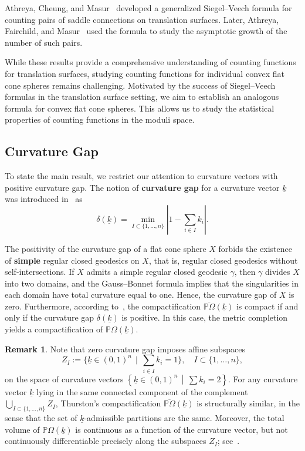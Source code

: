 \documentclass{compositio}
\numberwithin{equation}{section}
\numberwithin{figure}{section}
\theoremstyle{definition}
\newtheorem{remark}[definition]{Remark}
\theoremstyle{plain}
\begin{document}
{Athreya, Cheung, and Masur~\cite{athreya2019siegel} developed a generalized Siegel--Veech formula for counting pairs of saddle connections on translation surfaces. Later, Athreya, Fairchild, and Masur~\cite{Athreya2023} used the formula to study the asymptotic growth of the number of such pairs.\newline

While these results provide a comprehensive understanding of counting functions for translation surfaces, studying counting functions for individual convex flat cone spheres remains challenging. Motivated by the success of Siegel--Veech formulas in the translation surface setting, we aim to establish an analogous formula for convex flat cone spheres. This allows us to study the statistical properties of counting functions in the moduli space.


\subsection{Curvature Gap}
To state the main result, we restrict our attention to curvature vectors with positive curvature gap. The notion of \textbf{curvature gap} for a curvature vector $\underline{k}$ was introduced in~\cite{fu2023boundssaddleconnectionsflat} as
\begin{equation}\label{equ:curvaturegap}
    \delta(\underline{k}) = \min_{I \subset \{1, \ldots, n\}} \left| 1 - \sum_{i \in I} k_i \right|.
\end{equation}

The positivity of the curvature gap of a flat cone sphere $X$ forbids the existence of \textbf{simple} regular closed geodesics on $X$, that is, regular closed geodesics without self-intersections. If $X$ admits a simple regular closed geodesic $\gamma$, then $\gamma$ divides $X$ into two domains, and the Gauss--Bonnet formula implies that the singularities in each domain have total curvature equal to one. Hence, the curvature gap of $X$ is zero. Furthermore, according to~\cite{thu}, the compactification $\overline{\mathbb{P}\Omega}(\underline{k})$ is compact if and only if the curvature gap $\delta(\underline{k})$ is positive. In this case, the metric completion yields a compactification of $\mathbb{P}\Omega(\underline{k})$.

\begin{remark}
    Note that zero curvature gap imposes affine subspaces 
$$
Z_I := \Big\{ \underline{k} \in (0,1)^n \,\mid\, \sum_{i \in I} k_i = 1 \Big\}, \quad I \subset \{1,\ldots,n\},
$$
on the space of curvature vectors $\left\{ \underline{k} \in (0,1)^n \,\middle|\, \sum k_i = 2 \right\}$. For any curvature vector $\underline{k}$ lying in the same connected component of the complement $\bigcup_{I \subset \{1,\ldots,n\}} Z_I$, Thurston's compactification $\overline{\mathbb{P}\Omega}(\underline{k})$ is structurally similar, in the sense that the set of $\underline{k}$-admissible partitions are the same. Moreover, the total volume of $\mathbb{P}\Omega(\underline{k})$ is continuous as a function of the curvature vector, but not continuously differentiable precisely along the subspaces $Z_I$; see~\cite{McMullen,KN}.
\end{remark}

}
\end{document}
